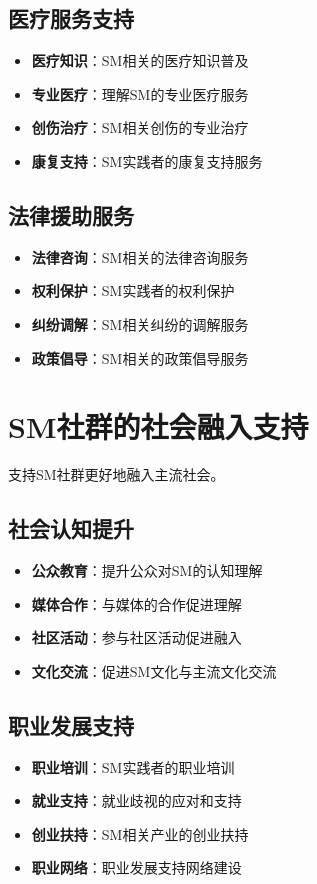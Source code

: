 \documentclass[12pt,UTF8]{ctexbook}
\begin{document}
\subsection{医疗服务支持}
\begin{itemize}[leftmargin=2cm]
	\item \textbf{医疗知识}：SM相关的医疗知识普及
	\item \textbf{专业医疗}：理解SM的专业医疗服务
	\item \textbf{创伤治疗}：SM相关创伤的专业治疗
	\item \textbf{康复支持}：SM实践者的康复支持服务
\end{itemize}

\subsection{法律援助服务}
\begin{itemize}[leftmargin=2cm]
	\item \textbf{法律咨询}：SM相关的法律咨询服务
	\item \textbf{权利保护}：SM实践者的权利保护
	\item \textbf{纠纷调解}：SM相关纠纷的调解服务
	\item \textbf{政策倡导}：SM相关的政策倡导服务
\end{itemize}

\section{SM社群的社会融入支持}
支持SM社群更好地融入主流社会。

\subsection{社会认知提升}
\begin{itemize}[leftmargin=2cm]
	\item \textbf{公众教育}：提升公众对SM的认知理解
	\item \textbf{媒体合作}：与媒体的合作促进理解
	\item \textbf{社区活动}：参与社区活动促进融入
	\item \textbf{文化交流}：促进SM文化与主流文化交流
\end{itemize}

\subsection{职业发展支持}
\begin{itemize}[leftmargin=2cm]
	\item \textbf{职业培训}：SM实践者的职业培训
	\item \textbf{就业支持}：就业歧视的应对和支持
	\item \textbf{创业扶持}：SM相关产业的创业扶持
	\item \textbf{职业网络}：职业发展支持网络建设
\end{itemize}
\end{document}
